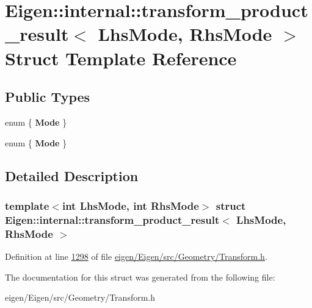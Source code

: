 \hypertarget{struct_eigen_1_1internal_1_1transform__product__result}{}\section{Eigen\+:\+:internal\+:\+:transform\+\_\+product\+\_\+result$<$ Lhs\+Mode, Rhs\+Mode $>$ Struct Template Reference}
\label{struct_eigen_1_1internal_1_1transform__product__result}
\subsection*{Public Types}
\begin{DoxyCompactItemize}
\item 
\mbox{\label{struct_eigen_1_1internal_1_1transform__product__result_aa8ca2018f3d454f176cb6767793c4518}} 
enum \{ {\bfseries Mode}
 \}
\item 
\mbox{\label{struct_eigen_1_1internal_1_1transform__product__result_a04e5cd703289f002f0b6df269e0a18e2}} 
enum \{ {\bfseries Mode}
 \}
\end{DoxyCompactItemize}


\subsection{Detailed Description}
\subsubsection*{template$<$int Lhs\+Mode, int Rhs\+Mode$>$\newline
struct Eigen\+::internal\+::transform\+\_\+product\+\_\+result$<$ Lhs\+Mode, Rhs\+Mode $>$}



Definition at line \hyperlink{eigen_2_eigen_2src_2_geometry_2_transform_8h_source_l01298}{1298} of file \hyperlink{eigen_2_eigen_2src_2_geometry_2_transform_8h_source}{eigen/\+Eigen/src/\+Geometry/\+Transform.\+h}.



The documentation for this struct was generated from the following file\+:\begin{DoxyCompactItemize}
\item 
eigen/\+Eigen/src/\+Geometry/\+Transform.\+h\end{DoxyCompactItemize}
